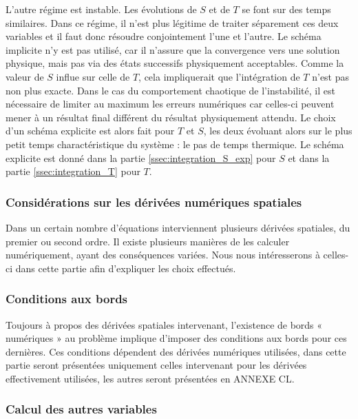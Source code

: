 L'autre régime est instable. Les évolutions de $S$ et de $T$ se font sur des temps similaires. Dans ce régime, il n'est plus légitime de traiter séparement ces deux variables et il faut donc résoudre conjointement l'une et l'autre. Le schéma implicite n'y est pas utilisé, car il n'assure que la convergence vers une solution physique, mais pas via des états successifs physiquement acceptables. Comme la valeur de $S$ influe sur celle de $T$, cela impliquerait que l'intégration de $T$ n'est pas non plus exacte. Dans le cas du comportement chaotique de l'instabilité, il est nécessaire de limiter au maximum les erreurs numériques car celles-ci peuvent mener à un résultat final différent du résultat physiquement attendu. Le choix d'un schéma explicite est alors fait pour $T$ et $S$, les deux évoluant alors sur le plus petit temps charactéristique du système : le pas de temps thermique. Le schéma explicite est donné dans la partie \ref{ssec:integration_S_exp} pour $S$ et dans la partie \ref{ssec:integration_T} pour $T$.


\subsubsection{Considérations sur les dérivées numériques spatiales}

Dans un certain nombre d’équations interviennent plusieurs dérivées spatiales,
du premier ou second ordre. Il existe plusieurs manières de les calculer
numériquement, ayant des conséquences variées. Nous nous intéresserons à
celles-ci dans cette partie afin d’expliquer les choix effectués.

\subsubsection{Conditions aux bords}

Toujours à propos des dérivées spatiales intervenant, l’existence de bords «
numériques » au problème implique d’imposer des conditions aux bords pour ces
dernières. Ces conditions dépendent des dérivées numériques utilisées, dans
cette partie seront présentées uniquement celles intervenant pour les dérivées
effectivement utilisées, les autres seront présentées en ANNEXE CL.

\subsubsection{Calcul des autres variables}

%


